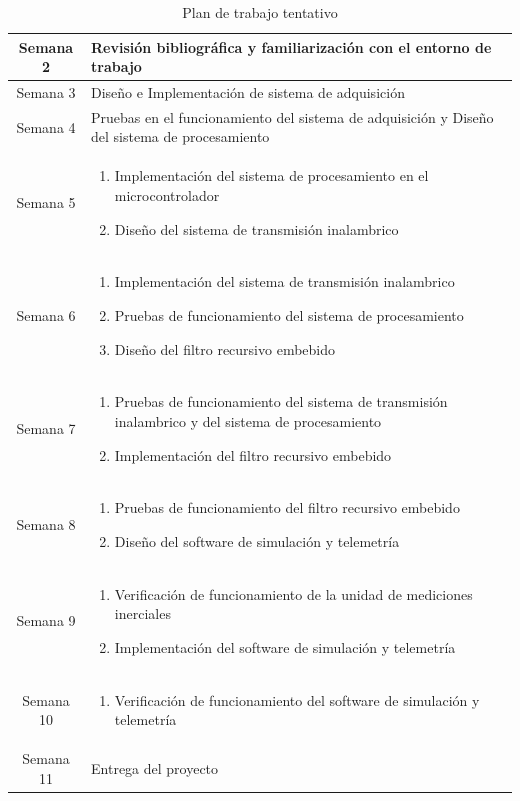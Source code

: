 \documentclass{article}
\begin{document}
\begin{table}[h!]
	\centering
	\caption{Plan de trabajo tentativo}
	\begin{tabular}{| c | p{10cm} |}
		\hline
		Semana 2& Revisi\'on bibliogr\'afica y familiarizaci\'on con el entorno de trabajo\\
		\hline
		Semana 3& Dise\~{n}o e Implementaci\'on de sistema de adquisici\'on\\
		\hline
		Semana 4& Pruebas en el funcionamiento del sistema de adquisici\'on y Dise\~{n}o del sistema de procesamiento\\
		\hline
		Semana 5& 
		\begin{enumerate} 
		    \item Implementaci\'on del sistema de procesamiento en el microcontrolador
		    \item Dise\~{n}o del sistema de transmisi\'on inalambrico
		\end{enumerate} \\
		\hline
		Semana 6&
		\begin{enumerate} 
		    \item Implementaci\'on del sistema de transmisi\'on inalambrico
		    \item Pruebas de funcionamiento del sistema de procesamiento
		    \item Dise\~{n}o del filtro recursivo embebido
		\end{enumerate}\\
		\hline
		Semana 7& 
		\begin{enumerate} 
		    \item Pruebas de funcionamiento del sistema de  transmisi\'on inalambrico y del sistema de procesamiento
		    \item Implementaci\'on del filtro recursivo embebido
		\end{enumerate}\\
		\hline
		Semana 8& 
		\begin{enumerate} 
		    \item Pruebas de funcionamiento del filtro recursivo embebido
		    \item Dise\~{n}o del software de simulaci\'on  y telemetr\'ia
		\end{enumerate}\\
		\hline
		Semana 9& 
		\begin{enumerate} 
		    \item Verificaci\'on de funcionamiento de la unidad de mediciones inerciales
		    \item Implementaci\'on del software de simulaci\'on  y telemetr\'ia
		\end{enumerate}\\
		\hline
		Semana 10& 
		\begin{enumerate} 
		    \item Verificaci\'on de funcionamiento del software de simulaci\'on y telemetr\'ia
		\end{enumerate}\\
		\hline
		Semana 11& Entrega del proyecto
		\\
		\hline
	\end{tabular}
\end{table}
\end{document}
